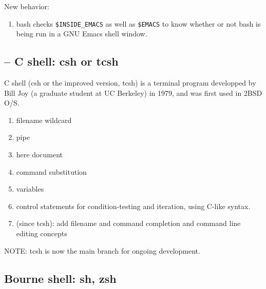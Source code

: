 New behavior:
\begin{enumerate}
  \item bash checks \verb!$INSIDE_EMACS! as well as \verb!$EMACS!
  to know  whether or not bash is being run in a GNU Emacs shell window.
  
  
   
\end{enumerate}

\subsection{-- C shell: csh or tcsh}
\label{sec:csh-shell}
\label{sec:tcsh-shell}

C shell (csh or the improved version, tcsh) is a terminal program developped by
Bill Joy (a graduate student at UC Berkeley) in 1979, and was first used in 2BSD
O/S. 
\begin{enumerate}
  \item filename wildcard
  
  \item pipe
  
  \item here document 
  
  \item command substitution 
  
  \item variables
  
  \item control statements for condition-testing and iteration, using C-like
  syntax. 
  
  \item (since tcsh): add  filename and command completion and command line
  editing concepts
\end{enumerate}

NOTE: tcsh is now the main branch for ongoing development.

\subsection{Bourne shell: sh, zsh}
\label{sec:bourne-shell}
\label{sec:zsh-shell}

